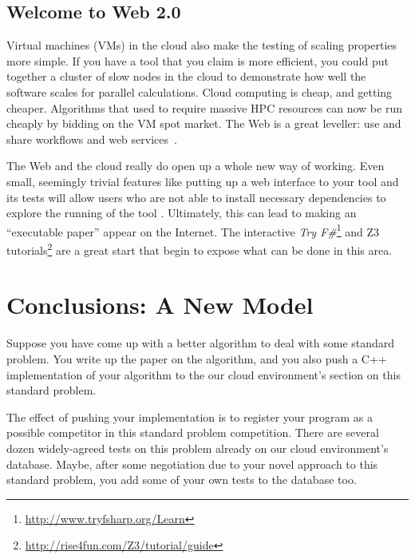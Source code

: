 \documentclass[10pt,conference,final]{IEEEtran}
\begin{document}
\subsection{Welcome to Web 2.0}

Virtual machines (VMs) in the cloud also make the testing of scaling
properties more simple.  If you have a tool that you claim is more
efficient, you could put together a cluster of slow nodes in the cloud
to demonstrate how well the software scales for parallel calculations.
Cloud computing is cheap, and getting cheaper. Algorithms that used to
require massive HPC resources can now be run cheaply by bidding on the
VM spot market. The Web is a great leveller: use and share workflows
and web services~\cite{crick-et-al:2009b}.

 The Web and the
cloud really do open up a whole new way of working. Even small,
seemingly trivial features like putting up a web interface to your
tool and its tests will allow users who are not able to install
necessary dependencies to explore the running of the tool
\cite{Hall2014}. Ultimately, this can lead to making an ``executable
paper'' appear on the Internet. The interactive {\em Try
F\#}\footnote{\url{http://www.tryfsharp.org/Learn}} and Z3
tutorials\footnote{\url{http://rise4fun.com/Z3/tutorial/guide}} are a
great start that begin to expose what can be done in this area.


\section{Conclusions: A New Model}\label{sec:Conclusion} 

\newline\newline Suppose you have come up with a better
algorithm to deal with some standard problem.  You write up the paper
on the algorithm, and you also push a C++ implementation of your
algorithm to the our cloud environment's section on this standard problem.

The effect of pushing your implementation is to register your program
as a possible competitor in this standard problem competition. There
are several dozen widely-agreed tests on this problem already on our
cloud environment's database. Maybe, after some negotiation due to
your novel approach to this standard problem, you add some of your own
tests to the database too.
\end{document}
